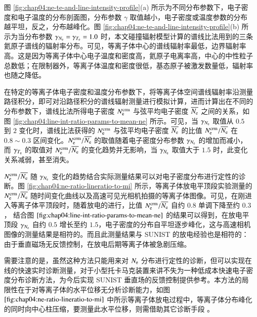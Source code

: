 图 \ref{fig:chap04:ne-te-and-line-intensity-profile}(a) 所示为不同分布参数下，电子密度和电子温度的分布剖面图，分布参数 $\gamma$ 取值越小，电子密度或温度参数的分布越平坦，反之，分布越峰化。图 \ref{fig:chap04:ne-te-and-line-intensity-profile}(b) 所示为当分布参数 $\gamma_{N_{\rm e}}=\gamma_{T_{\rm e}}=1.0$ 时，本文碰撞辐射模型计算的谱线比法用到的三条氦原子谱线的辐射率分布。可见，等离子体中心的谱线辐射率最低，边界辐射率高。这是因为等离子体中心电子温度和密度高，氦原子电离率高，中心的中性粒子总数低；在限制器外，等离子体温度和密度很低，基态原子被激发数量低，辐射率也随之降低。

在特定的等离子体电子密度和温度分布参数下，将等离子体空间谱线辐射率沿测量路径积分，即可对沿路径积分的谱线辐射测量进行模拟计算，进而计算出在不同的分布参数下，谱线比法所得电子密度 $N_{\rm e}^{\rm crm}$ 与弦平均电子密度 $\overline{N_{\rm e}}$ 之间的关系，如图 \ref{fig:chap04:line-int-ratio-params-to-mean-ne} 所示。可见，当 $\gamma_{N_{\rm e}}$ 取值从 $0.5$ 到 $2$ 变化时，谱线比法获得的 $N_{\rm e}^{\rm crm}$ 与弦平均电子密度 $\overline{N_{\rm e}}$ 的比值 $N_{\rm e}^{\rm crm}/\overline{N_{\rm e}}$ 在 $0.8\sim0.3$ 区间变化。$N_{\rm e}^{\rm crm}/\overline{N_{\rm e}}$ 的取值随着电子密度分布参数 $\gamma_{N_{\rm e}}$ 的增加而减小，而 $\gamma_{T_{\rm e}}$ 的取值对 $N_{\rm e}^{\rm crm}/\overline{N_{\rm e}}$ 的变化趋势并无影响，当 $\gamma_{N_{\rm e}}$ 取值大于 $1.5$ 时，此变化关系减弱，甚至消失。

$N_{\rm e}^{\rm crm}/\overline{N_{\rm e}}$ 随 $\gamma_{N_{\rm e}}$ 变化的趋势结合实际测量结果可以对电子密度分布进行定性的诊断。图 \ref{fig:chap04:ne-ratio-lineratio-to-mi} 所示，等离子体放电平顶段实验测量的 $N_{\rm e}^{\rm crm}/\overline{N_{\rm e}}$ 随时间变化曲线以及高速可见光相机拍摄的等离子体图像。可见，在刚进入等离子体平顶段时，随着放电的进行，比值 $N_{\rm e}^{\rm crm}/\overline{N_{\rm e}}$ 自约 $0.8$ 单调下降至约 $0.3$， 结合图 $\ref{fig:chap04:line-int-ratio-params-to-mean-ne}$ 的结果可以得到，在放电平顶段 $\gamma_{N_{\rm e}}$ 自约 $0.5$ 增长至约 $1.5$，电子密度的分布自平坦逐步峰化，这与高速相机图像的测量结果是相符的。而且此测量结果与 SUNIST 的放电经验也是相符的：由于垂直磁场无反馈控制，在放电后期等离子体被急剧压缩\cite{ZengLong2010:Thesis}。

需要注意的是，虽然这种方法只能用来对 $N_{\rm e}$ 分布进行定性的诊断，但可以实现在线的快速实时诊断测量，对于小型托卡马克装置来讲不失为一种低成本快速电子密度分布诊断方法，为今后实现 SUNIST 垂直场的反馈控制提供参考。本方法的局限性在于对等离子体的水平位移无分析诊断能力，如图 $\ref{fig:chap04:ne-ratio-lineratio-to-mi}$ 中所示等离子体放电过程中，等离子体分布峰化的同时向中心柱压缩，要测量此水平位移，则需借助其它诊断手段
\cite{Elahi2011:displacement,Soltwisch1983:plasma-position}。

